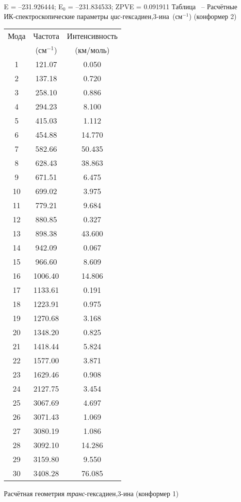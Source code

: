{ E =  --231.926444;    E$_0$ =  --231.834533; ZPVE = 0.091911
\newpage {}
Таблица \thet\, -- Расчётные ИК-спектроскопические параметры {\itshape цис}-гексадиен,3\nobreakdash-ина~(см$^{-1}$) (конформер 2)
 \begin{center}
\begin{tabular}{ccc}
Мода & Частота   & Интенсивность \\
&(см$^{-1}$)&(км/моль)\\
 \hline
     1 &  121.07 &     0.050 \\
     2 &  137.18 &   0.720 \\
    3 &  258.10 &     0.886 \\
     4 &  294.23 &    8.100 \\
     5 &  415.03 &    1.112 \\
     6 &  454.88 &  14.770 \\
     7 &  582.66 &  50.435 \\
     8 &  628.43 &   38.863 \\
    9 &  671.51 &     6.475 \\
    10 &  699.02 &   3.975 \\
    11 &  779.21 &   9.684 \\
    12 &  880.85 &    0.327 \\
    13 &  898.38 &  43.600 \\
    14 &  942.09 &   0.067 \\
    15 &  966.60 &    8.609 \\
    16 & 1006.40 &  14.806 \\
    17 & 1133.61 &    0.191 \\
    18 & 1223.91 &    0.975 \\
    19 & 1270.68 &   3.168 \\
    20 & 1348.20 &    0.825 \\
    21 & 1418.44 &   5.824 \\
    22 & 1577.00 &    3.871 \\
    23 & 1629.46 &   0.908 \\
    24 & 2127.75 &    3.454 \\
    25 & 3067.69 &    4.697 \\
    26 & 3071.43 &    1.069 \\
    27 & 3080.19 &    1.086 \\
    28 & 3092.10 &  14.286 \\
    29 & 3159.80 &    9.550 \\
    30 & 3408.28 &   76.085 \\
 \end{tabular}
\end{center}
\newpage
Расчётная геометрия {\itshape транс}-гексадиен,3\nobreakdash-ина (конформер 1)

}
